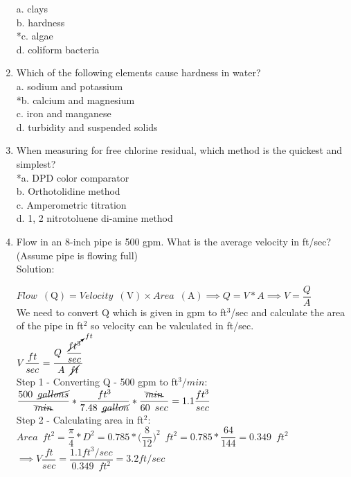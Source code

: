 \begin{enumerate}[1.]
a. clays\\
b. hardness\\
*c. algae\\
d. coliform bacteria\\
\item Which of the following elements cause hardness in water?\\
a. sodium and potassium\\
*b. calcium and magnesium\\
c. iron and manganese\\
d. turbidity and suspended solids\\
\item When measuring for free chlorine residual, which method is the quickest and simplest?\\
*a. DPD color comparator\\
b. Orthotolidine method\\
c. Amperometric titration\\
d. 1, 2 nitrotoluene di-amine method\\
\newpage
\item Flow in an 8-inch pipe is 500 gpm. What is the average velocity in ft/sec? (Assume pipe is flowing full)\\
Solution:\\
\vspace{0.2cm}

$Flow \enspace(\mathrm{Q})= Velocity \enspace(\mathrm{V})  \times Area \enspace(\mathrm{A}) \implies Q=V*A \implies V=\dfrac{Q}{A}$\\
We need to convert Q which is given in gpm to ft${^3}$/sec and calculate the area of the pipe in ft${^2}$ so velocity can be valculated in ft/sec.\\
\vspace{0.2cm}
$ V \dfrac{ft}{sec} = \dfrac{Q \enspace \dfrac{\cancelto{ft}{ft^3}}{sec}}{A \enspace\cancel{ft}}$\\
\vspace{0.2cm}
Step 1 - Converting Q - 500 gpm to ft${^3}/min$:\\
\vspace{0.2cm}
$\dfrac{500 \enspace \cancel{gallons}}{\bcancel{min}}*\dfrac{ft^3}{7.48 \enspace \cancel{gallon}}*\dfrac{\bcancel{min}}{60 \enspace sec}=1.1\dfrac{ft^3}{sec}$\\
\vspace{0.2cm}
Step 2 - Calculating area in ft${^2}$:\\
\vspace{0.2cm}
$Area \enspace ft^2= \dfrac{\pi}{4}*D^2= 0.785*\Big(\dfrac{8}{12}\Big)^2 \enspace ft^2=0.785*\dfrac{64}{144}=0.349 \enspace ft^2$\\
\vspace{0.2cm}
$\implies V \dfrac{ft}{sec} = \dfrac{ 1.1 ft^3/sec}{0.349 \enspace ft^2} = \boxed{3.2 ft/sec}$\\
\vspace{0.3cm} 



\end{enumerate}
